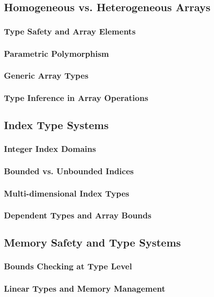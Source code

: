 \documentclass[12pt, oneside]{book}
\begin{document}
\subsection{Homogeneous vs. Heterogeneous Arrays}
\subsubsection{Type Safety and Array Elements}
\subsubsection{Parametric Polymorphism}
\subsubsection{Generic Array Types}
\subsubsection{Type Inference in Array Operations}

\subsection{Index Type Systems}
\subsubsection{Integer Index Domains}
\subsubsection{Bounded vs. Unbounded Indices}
\subsubsection{Multi-dimensional Index Types}
\subsubsection{Dependent Types and Array Bounds}

\subsection{Memory Safety and Type Systems}
\subsubsection{Bounds Checking at Type Level}
\subsubsection{Linear Types and Memory Management}
\end{document}
